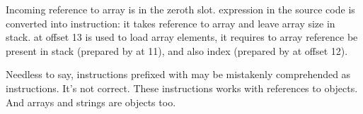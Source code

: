 Incoming reference to array is in the zeroth slot.
 expression in the source code is converted into  instruction: 
it takes reference to array and leave array size in stack.
 at offset 13 is used to load array elements, it requires to array reference be present
in stack (prepared by  at 11), and also index (prepared by  at offset 12).

Needless to say, instructions prefixed with  may be mistakenly comprehended 
as  instructions.
It's not correct.
These instructions works with references to objects.
And arrays and strings are objects too.
